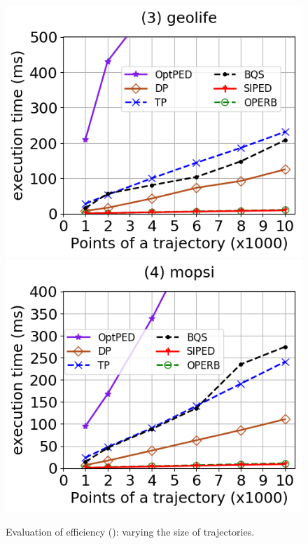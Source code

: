 \begin{figure}[tb!]
	\includegraphics[scale=0.315]{Figures/Exp-PED-time-size-geolife.png}	\hspace{1ex}
	\includegraphics[scale=0.315]{Figures/Exp-PED-time-size-mopsi.png}	\hspace{1ex}
	\vspace{-2.5ex}
	\caption{\small Evaluation of efficiency (\ped): varying the size of trajectories.}\label{fig:time-size-ped}
	\vspace{-2ex}
\end{figure}

